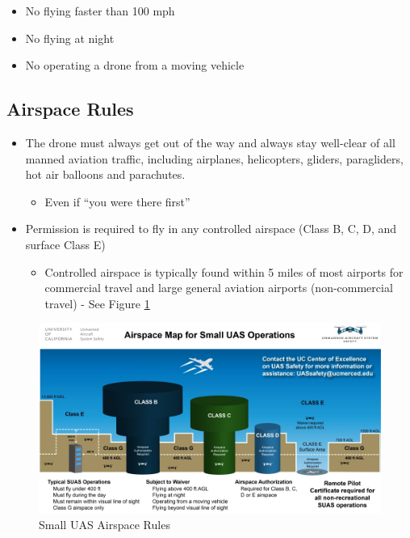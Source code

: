 \documentclass[
  12pt,
]{book}
\providecommand{\tightlist}{%
  \setlength{\itemsep}{0pt}\setlength{\parskip}{0pt}}
\begin{document}
\begin{itemize}
\tightlist
\item
  No flying faster than 100 mph
\item
  No flying at night
\item
  No operating a drone from a moving vehicle
\end{itemize}

\hypertarget{airspace-rules}{%
\subsection{Airspace Rules}\label{airspace-rules}}

\begin{itemize}
\tightlist
\item
  The drone must always get out of the way and always stay well-clear of all manned aviation traffic, including airplanes, helicopters, gliders, paragliders, hot air balloons and parachutes.

  \begin{itemize}
  \tightlist
  \item
    Even if ``you were there first''
  \end{itemize}
\item
  Permission is required to fly in any controlled airspace (Class B, C, D, and surface Class E)

  \begin{itemize}
  \tightlist
  \item
    Controlled airspace is typically found within 5 miles of most airports for commercial travel and large general aviation airports (non-commercial travel) - See Figure \ref{fig:SUAS-airspace-regs}
  \end{itemize}
\end{itemize}

\begin{figure}

{\centering \includegraphics[width=0.9\linewidth]{images/SUAS_airspace_map} 

}

\caption{Small UAS Airspace Rules}\label{fig:SUAS-airspace-regs}
\end{figure}
\end{document}
